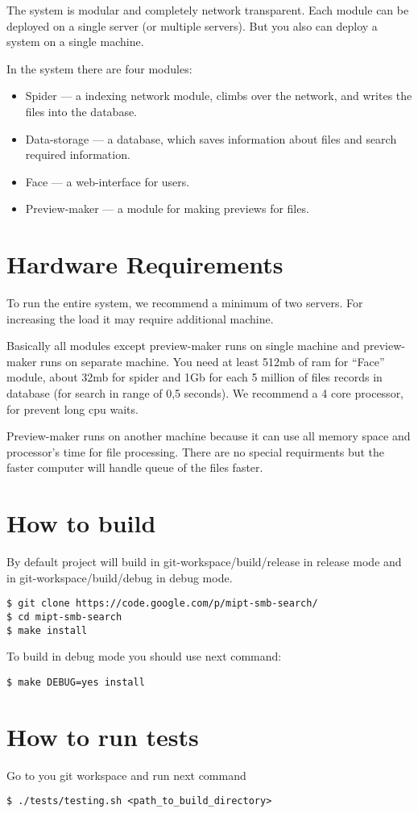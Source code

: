 \documentclass[11pt, twoside, a4paper]{book}
\begin{document}
The system is modular and completely network transparent. Each module can be deployed on a single server (or multiple servers). But you also can deploy a system on a single machine.

In the system there are four modules:

\begin{itemize}
  \item Spider --- a indexing network module, climbs over the network, and writes the files into the database.
  \item Data-storage --- a database, which saves information about files and search required information.
  \item Face --- a web-interface for users.
  \item Preview-maker --- a module for making previews for files.
\end{itemize}


\section{Hardware Requirements}
To run the entire system, we recommend a minimum of two servers. For increasing the load it may require additional machine.

Basically all modules except preview-maker runs on single machine and preview-maker runs on separate machine. You need at least 512mb of ram for ``Face'' module, about 32mb for spider and 1Gb for each 5 million of files records in database (for search in range of 0,5 seconds). We recommend a 4 core processor, for prevent long cpu waits.

Preview-maker runs on another machine because it can use all memory space and processor's time for file processing. There are no special requirments but the faster computer will handle queue of the files faster.

\section{How to build}\label{sec:build}

By default project will build in git-workspace/build/release in release mode and in git-workspace/build/debug in debug mode.

\begin{lstlisting}
$ git clone https://code.google.com/p/mipt-smb-search/
$ cd mipt-smb-search
$ make install
\end{lstlisting}

To build in debug mode you should use next command:

\begin{lstlisting}
$ make DEBUG=yes install
\end{lstlisting}

\section{How to run tests}\label{sec:tests}

Go to you git workspace and run next command

\begin{lstlisting}
$ ./tests/testing.sh <path_to_build_directory>
\end{lstlisting}
\end{document}
